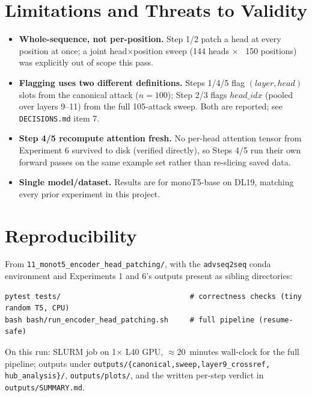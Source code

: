 \documentclass[11pt]{article}
\begin{document}
\section{Limitations and Threats to Validity}

\begin{itemize}
  \item \textbf{Whole-sequence, not per-position.} Step 1/2 patch a head at every
  position at once; a joint head$\times$position sweep (144 heads $\times$ ~150
  positions) was explicitly out of scope this pass.
  \item \textbf{Flagging uses two different definitions.} Steps 1/4/5 flag
  $(layer, head)$ slots from the canonical attack ($n{=}100$); Step 2/3 flags $head\_idx$
  (pooled over layers 9--11) from the full 105-attack sweep. Both are reported; see
  \texttt{DECISIONS.md} item 7.
  \item \textbf{Step 4/5 recompute attention fresh.} No per-head attention tensor from
  Experiment 6 survived to disk (verified directly), so Steps 4/5 run their own forward
  passes on the same example set rather than re-slicing saved data.
  \item \textbf{Single model/dataset.} Results are for monoT5-base on DL19, matching
  every prior experiment in this project.
\end{itemize}

\section{Reproducibility}

From \texttt{11\_monot5\_encoder\_head\_patching/}, with the \texttt{advseq2seq} conda
environment and Experiments 1 and 6's outputs present as sibling directories:

\begin{lstlisting}
pytest tests/                              # correctness checks (tiny random T5, CPU)
bash bash/run_encoder_head_patching.sh     # full pipeline (resume-safe)
\end{lstlisting}

\noindent On this run: SLURM job on 1$\times$ L40 GPU, $\approx$20~minutes wall-clock for
the full pipeline; outputs under \texttt{outputs/\{canonical,sweep,layer9\_crossref,
hub\_analysis\}/}, \texttt{outputs/plots/}, and the written per-step verdict in
\texttt{outputs/SUMMARY.md}.
\end{document}

